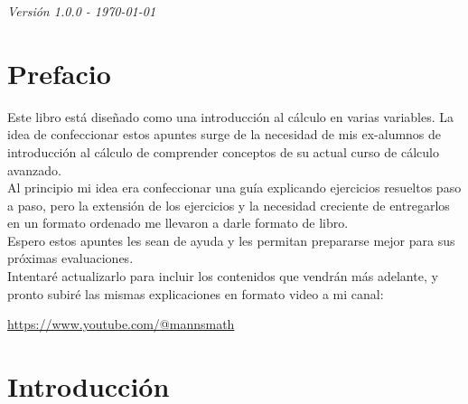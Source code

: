 \documentclass[12pt,openany]{book}
\begin{document}
\newpage
\begin{center}
    \vspace{1cm}
    \textit{Versión 1.0.0 - \today}
\end{center}

\chapter*{Prefacio}
Este libro está diseñado como una introducción al cálculo en varias variables. La idea de confeccionar estos apuntes surge de la necesidad de mis ex-alumnos de introducción al cálculo de comprender conceptos de su actual curso de cálculo avanzado.\\

Al principio mi idea era confeccionar una guía explicando ejercicios resueltos paso a paso, pero la extensión de los ejercicios y la necesidad creciente de entregarlos en un formato ordenado me llevaron a darle formato de libro.\\

Espero estos apuntes les sean de ayuda y les permitan prepararse mejor para sus próximas evaluaciones.\\ 

Intentaré actualizarlo para incluir los contenidos que vendrán más adelante, y pronto subiré las mismas explicaciones en formato video a mi canal:

\url{https://www.youtube.com/@mannsmath}


\thispagestyle{empty}
\mbox{}
\newpage

\chapter*{Introducción}



% 
\end{document}

